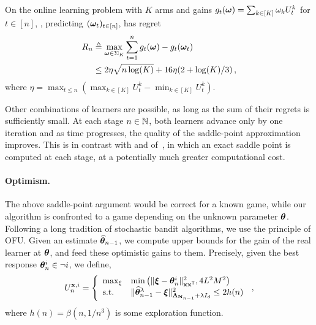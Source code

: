 \begin{lemma}\label{lemma:lgc.adahedge}
\begin{leftbar}[lemmabar]
On the online learning problem with $K$ arms and gains $g_t({\boldsymbol \omega}) = \sum_{k\in[K]} \omega_k  U_t^k$ for $t\in[n]$, \AH, predicting $({\boldsymbol \omega}_t)_{t\in[n]}$, has regret
\begin{align*}
    R_n &\triangleq \max_{{\boldsymbol \omega}\in\Sigma_K}\sum_{t=1}^n g_t({\boldsymbol \omega}) - g_t({\boldsymbol \omega}_t) \\
    &\le 2\eta\sqrt{n\log(K)} + 16\eta(2+\log(K)/3) \,,
\end{align*}
where $\eta = \max_{t\le n}  (\max_{k\in[K]}U_t^{k}- \min_{k\in[K]}U_t^{k})$.
\end{leftbar}
\end{lemma}
Other combinations of learners are possible, as long as the sum of their regrets is sufficiently small. At each stage $n\in{\mathbb N}$, both learners advance only by one iteration and as time progresses, the quality of the saddle-point approximation improves. This is in contrast with \CT and \DT of~\cite{garivier2016tracknstop}, in which an exact saddle point is computed at each stage, at a potentially much greater computational cost.

\paragraph{Optimism.} The above saddle-point argument would be correct for a known game, while our algorithm is confronted to a game depending on the unknown parameter ${\boldsymbol \theta}$. Following a long tradition of stochastic bandit algorithms, we use the principle of OFU. Given an estimate $\widehat{{\boldsymbol \theta}}_{n-1}$, we compute upper bounds for the gain of the real learner at ${\boldsymbol \theta}$, and feed these optimistic gains to them. Precisely, given the best response ${\boldsymbol \theta}_n^i \in \neg i$, we define,
\begin{align*}
    U_n^{{\bf x},i} =\left\{
    \begin{array}{ll}
    \max_{\xi} & \min\big(\Vert {\boldsymbol \xi} - {\boldsymbol \theta}_n^i \Vert^2_{{\bf x}{\bf x}^\mathsf{\scriptscriptstyle T}},4L^2M^2\big)\\
    \text{s.t.} & \Vert \widehat{{\boldsymbol \theta}}_{n-1}^\lambda - {\boldsymbol \xi} \Vert^2_{{\boldsymbol \Lambda}_{{\bf N}_{n-1}}+\lambda I_d} \le 2h(n)
    \end{array}
    \right.\,,
\end{align*}
where $h(n)=\beta(n, 1/n^3)$ is some exploration function. 

